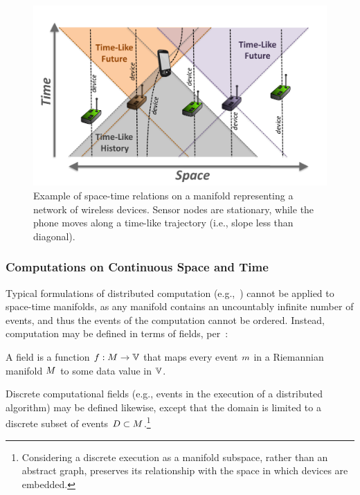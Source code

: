 \documentclass[12pt,a4paper,twoside,openright]{book}
\begin{document}
\begin{figure}
\centering
\includegraphics[width=\columnwidth]{img/spacetime}
\caption[Example of space-time relations on a manifold]{Example of space-time relations on a manifold representing a network of wireless devices.
  Sensor nodes are stationary, while the phone moves along a time-like trajectory (i.e., slope less than diagonal).
}
\label{f:spacetime}
\end{figure}

\subsubsection{Computations on Continuous Space and Time}

Typical formulations of distributed computation (e.g.,~\cite{Lynch:1996:DA:525656}) cannot be applied to space-time manifolds, as any manifold contains an uncountably infinite number of events, and thus the events of the computation cannot be ordered.
%
Instead, computation may be defined in terms of fields, per~\cite{bealBasisSCW10,BVD-SCW14,BealUsbeck12}:
\begin{thrdefn}
  A field is a function $\field: \manifold \rightarrow \spaceof{\datavalue}$ that maps every event $m$ in a Riemannian manifold $M$ to some data value in $\spaceof{\datavalue}$.
\end{thrdefn}
\noindent
Discrete computational fields (e.g., events in the execution of a distributed algorithm) may be defined likewise, except that the domain is limited to a discrete subset of events $D \subset M$.\footnote{Considering a discrete execution as a manifold subspace, rather than an abstract graph, preserves its relationship with the space in which devices are embedded.}
\end{document}
